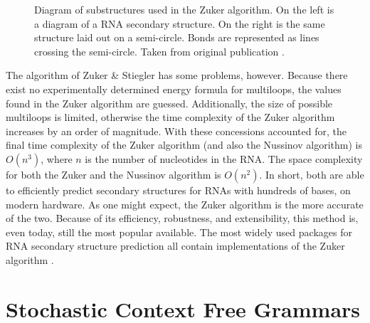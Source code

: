\documentclass[12pt, a4paper]{article}
\begin{document}
\begin{figure}
\begin{center}
\end{center}
\caption{Diagram of substructures used in the Zuker algorithm. On the left is a diagram of a RNA secondary structure. On the right is the same structure laid out on a semi-circle. Bonds are represented as lines crossing the semi-circle. Taken from original
publication \cite{zuker1981optimal}.}
\label{fig:zuk_struct}
\end{figure}


The algorithm of Zuker \& Stiegler \cite{zuker1981optimal} has some problems, however. Because there exist no experimentally determined energy formula for multiloops, the values found in the Zuker algorithm are guessed. Additionally, the size of possible multiloops is limited, otherwise the time complexity of the Zuker algorithm increases by an order of magnitude. With these concessions accounted for, the final time complexity of the Zuker algorithm (and also the Nussinov algorithm) is $O(n^3)$, where $n$ is the number of nucleotides in the RNA. The space complexity for both the Zuker and the Nussinov algorithm is $O(n^2)$. In short, both are able to efficiently predict secondary structures for RNAs with hundreds of bases, on modern hardware. As one might expect, the Zuker algorithm is the more accurate of the two. Because of
its efficiency, robustness, and extensibility, this method is,
even today, still the most popular available. The most widely used packages for RNA secondary structure prediction all contain implementations of the Zuker algorithm \cite{lorenz2011viennarna, reuter2010rnastructure}.


\section{Stochastic Context Free Grammars}
\end{document}
